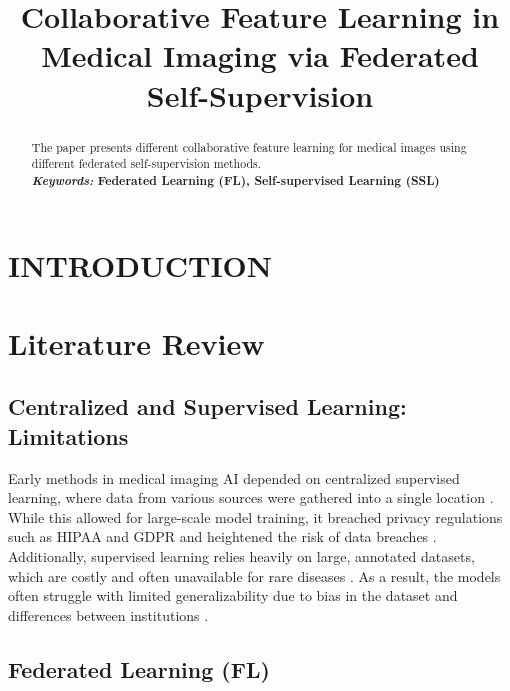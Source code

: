 \documentclass[a4paper, 10 pt, conference]{ieeeconf}
\begin{document}

\newpage
\twocolumn
\title{Collaborative Feature Learning in Medical Imaging via Federated Self-Supervision}
\maketitle 

\begin{abstract}
The paper presents different collaborative feature learning for medical images using different federated self-supervision methods. 
\\

{\small\textbf{\textit{Keywords: } Federated Learning (FL), Self-supervised Learning (SSL)}}
\end{abstract}

\section{INTRODUCTION}


\section{Literature Review}

\subsection{Centralized and Supervised Learning: Limitations}

Early methods in medical imaging AI depended on centralized supervised learning, where data from various sources were gathered into a single location \cite{Litjens2017}. While this allowed for large-scale model training, it breached privacy regulations such as HIPAA \cite{HIPAA} and GDPR \cite{GDPR} and heightened the risk of data breaches \cite{Kaissis2020}. Additionally, supervised learning relies heavily on large, annotated datasets, which are costly and often unavailable for rare diseases \cite{Willemink2020}. As a result, the models often struggle with limited generalizability due to bias in the dataset and differences between institutions \cite{Zech2018}.

\subsection{Federated Learning (FL)}
\end{document}
